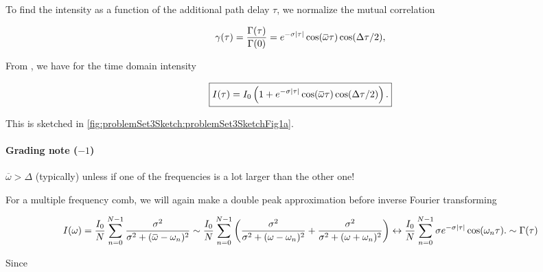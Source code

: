 {To find the intensity as a function of the additional path delay $\tau$, we normalize the mutual correlation

\begin{dmath}\label{eqn:modernOptics:problemSet3:1:440}
\gamma(\tau)
= \frac{\Gamma(\tau)}{\Gamma(0)}
=
e^{-\sigma \Abs{\tau}}
\cos( \overbar{\omega} \tau ) \cos ( \Delta \tau /2 ),
\end{dmath}

From , we have for the time domain intensity

\begin{dmath}\label{eqn:modernOptics:problemSet3:1:460}
\myBoxed{
I(\tau) = I_0
\left( 1 +
e^{-\sigma \Abs{\tau}}
\cos( \overbar{\omega} \tau ) \cos ( \Delta \tau /2 )
\right).
}
\end{dmath}

This is sketched in \cref{fig:problemSet3Sketch:problemSet3SketchFig1a}.

\paragraph{Grading note ($-1$)}
$\overbar{\omega} > \Delta$ (typically) unless if one of the frequencies is a lot larger than the other one!




For a multiple frequency comb, we will again make a double peak approximation before inverse Fourier transforming

\begin{dmath}\label{eqn:modernOptics:problemSet3:1:500}
I(\omega)
=
\frac{I_0}{N} \sum_{n = 0}^{N-1} \frac{\sigma^2}{\sigma^2 + (\overbar{\omega} - \omega_n)^2}
\sim
\frac{I_0}{N} \sum_{n = 0}^{N-1}
\left(
\frac{\sigma^2}{\sigma^2 + (\omega - \omega_n)^2}
+\frac{\sigma^2}{\sigma^2 + (\omega + \omega_n)^2}
\right)
\leftrightarrow
\frac{I_0}{N} \sum_{n = 0}^{N-1}
\sigma e^{-\sigma \Abs{\tau} } \cos(\omega_n \tau).
\sim \Gamma(\tau)
\end{dmath}

Since

}
